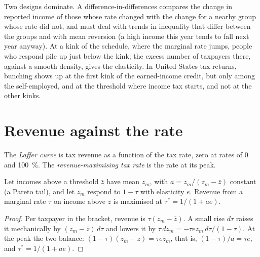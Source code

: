 \begin{measure}
Two designs dominate. A difference-in-differences compares the change in reported
income of those whose rate changed with the change for a nearby group whose rate
did not, and must deal with trends in inequality that differ between the groups and
with mean reversion (a high income this year tends to fall next year anyway). At a
kink of the schedule, where the marginal rate jumps, people who respond pile up just
below the kink; the excess number of taxpayers there, against a smooth density,
gives the elasticity. In United States tax returns, bunching shows up at the first
kink of the earned-income credit, but only among the self-employed, and at the
threshold where income tax starts, and not at the other kinks. %
\end{measure}

\section{Revenue against the rate}\label{sec:b3:efficiency-cost-of-taxation:laffer}

\begin{definition}\label{def:b3:efficiency-cost-of-taxation:laffer}
The \emph{Laffer curve} is tax revenue as a function of the tax rate, zero at rates of
0 and 100~\%. The \emph{revenue-maximising tax rate} is the rate at its peak.
\end{definition}

\begin{proposition}\label{prop:b3:efficiency-cost-of-taxation:topRate}
Let incomes above a threshold $\bar z$ have mean $z_m$, with $a = z_m/(z_m - \bar z)$ constant (a Pareto tail),
and let $z_m$ respond to $1 - \tau$ with elasticity $e$. Revenue from a marginal rate $\tau$ on income
above $\bar z$ is maximised at $\tau^* = 1/(1 + ae)$.
\end{proposition}

\begin{proof}
Per taxpayer in the bracket, revenue is $\tau(z_m - \bar z)$. A small rise $d\tau$ raises it mechanically
by $(z_m - \bar z)\,d\tau$ and lowers it by $\tau\,dz_m = -\tau ez_m\,d\tau/(1 - \tau)$. At the peak the two balance:
$(1 - \tau)(z_m - \bar z) = \tau ez_m$, that is, $(1 - \tau)/a = \tau e$, and $\tau^* = 1/(1 + ae)$.
\end{proof}

